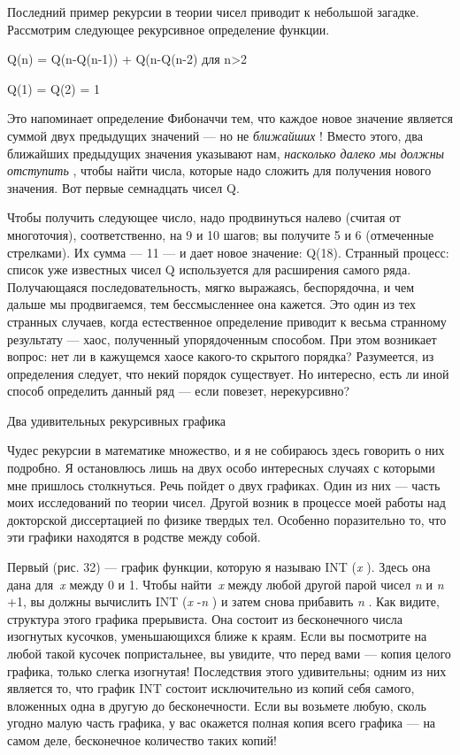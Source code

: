Последний пример рекурсии в теории чисел приводит к небольшой загадке. Рассмотрим следующее рекурсивное определение функции.

Q(n) = Q(n-Q(n-1)) + Q(n-Q(n-2) для n\textgreater2

Q(1) = Q(2) = 1

Это напоминает определение Фибоначчи тем, что каждое новое значение является суммой двух предыдущих значений --- но не \emph{ближайших} ! Вместо этого, два ближайших предыдущих значения указывают нам, \emph{насколько далеко мы должны отступить} , чтобы найти числа, которые надо сложить для получения нового значения. Вот первые семнадцать чисел Q.

Чтобы получить следующее число, надо продвинуться налево (считая от многоточия), соответственно, на 9 и 10 шагов; вы получите 5 и 6 (отмеченные стрелками). Их сумма --- 11 --- и дает новое значение: Q(18). Странный процесс: список уже известных чисел Q используется для расширения самого ряда. Получающаяся последовательность, мягко выражаясь, беспорядочна, и чем дальше мы продвигаемся, тем бессмысленнее она кажется. Это один из тех странных случаев, когда естественное определение приводит к весьма странному результату --- хаос, полученный упорядоченным способом. При этом возникает вопрос: нет ли в кажущемся хаосе какого-то скрытого порядка? Разумеется, из определения следует, что некий порядок существует. Но интересно, есть ли иной способ определить данный ряд --- если повезет, нерекурсивно?

Два удивительных рекурсивных графика

Чудес рекурсии в математике множество, и я не собираюсь здесь говорить о них подробно. Я остановлюсь лишь на двух особо интересных случаях с которыми мне пришлось столкнуться. Речь пойдет о двух графиках. Один из них --- часть моих исследований по теории чисел. Другой возник в процессе моей работы над докторской диссертацией по физике твердых тел. Особенно поразительно то, что эти графики находятся в родстве между собой.

Первый (рис. 32) --- график функции, которую я называю INT (\emph{x} ). Здесь она дана для~\emph{x} между 0 и 1. Чтобы найти~\emph{x} между любой другой парой чисел \emph{n} и \emph{n} +1, вы должны вычислить INT (\emph{x} -\emph{n} ) и затем снова прибавить \emph{n} . Как видите, структура этого графика прерывиста. Она состоит из бесконечного числа изогнутых кусочков, уменьшающихся ближе к краям. Если вы посмотрите на любой такой кусочек попристальнее, вы увидите, что перед вами --- копия целого графика, только слегка изогнутая! Последствия этого удивительны; одним из них является то, что график INT состоит исключительно из копий себя самого, вложенных одна в другую до бесконечности. Если вы возьмете любую, сколь угодно малую часть графика, у вас окажется полная копия всего графика --- на самом деле, бесконечное количество таких копий!

